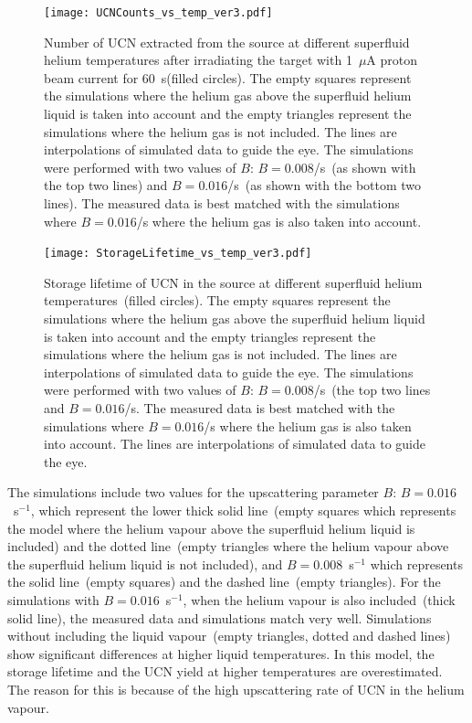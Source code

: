 \begin{figure}[h!]
  \centering
  \texttt{[image: UCNCounts\_vs\_temp\_ver3.pdf]}
  \caption[UCN yield versus superfluid helium temperature data and
  simulations]{Number of UCN extracted from the source at different
    superfluid helium temperatures after irradiating the target with
    1~$\mu$A proton beam current for 60~s(filled circles). The empty
    squares represent the simulations where the helium gas above the
    superfluid helium liquid is taken into account and the empty
    triangles represent the simulations where the helium gas is not
    included. The lines are interpolations of simulated data to guide
    the eye. The simulations were performed with two values of $B$:
    $B = 0.008$/s~(as shown with the top two lines) and
    $B = 0.016$/s~(as shown with the bottom two lines). The measured
    data is best matched with the simulations where $B = 0.016$/s
    where the helium gas is also taken into account.}
  \label{fig:Counts_vs_temp_sim}
\end{figure}

\begin{figure}[h!]
  \centering
  \texttt{[image: StorageLifetime\_vs\_temp\_ver3.pdf]}
  \caption[UCN storage lifetime versus superfluid helium temperature
  data and simulations]{Storage lifetime of UCN in the source at
    different superfluid helium temperatures~(filled circles).  The
    empty squares represent the simulations where the helium gas above
    the superfluid helium liquid is taken into account and the empty
    triangles represent the simulations where the helium gas is not
    included. The lines are interpolations of simulated data to guide
    the eye. The simulations were performed with two values of $B$:
    $B = 0.008$/s~(the top two lines and $B = 0.016$/s. The measured
    data is best matched with the simulations where $B = 0.016$/s
    where the helium gas is also taken into account.  The lines are
    interpolations of simulated data to guide the eye.}
  \label{fig:storage_vs_temp_sim}
\end{figure}

The simulations include two values for the upscattering parameter $B$:
$B= 0.016$~s$^{-1}$, which represent the lower thick solid line~(empty
squares which represents the model where the helium vapour above the
superfluid helium liquid is included) and the dotted line~(empty
triangles where the helium vapour above the superfluid helium liquid
is not included), and $B= 0.008$~s$^{-1}$ which represents the solid
line~(empty squares) and the dashed line~(empty triangles). For the
simulations with $B= 0.016$~s$^{-1}$, when the helium vapour is also
included~(thick solid line), the measured data and simulations match
very well. Simulations without including the liquid vapour~(empty
triangles, dotted and dashed lines) show significant differences at higher liquid
temperatures. In this model, the storage lifetime and the UCN yield at
higher temperatures are overestimated. The reason for this is because
of the high upscattering rate of UCN in the helium vapour.



